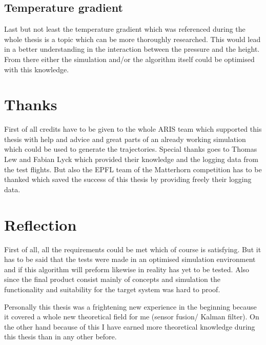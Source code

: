 \subsection{Temperature gradient}
Last but not least the temperature gradient which was referenced during the whole thesis is a topic which can be more thoroughly researched.
This would lead in a better understanding in the interaction between the pressure and the height.
From there either the simulation and/or the algorithm itself could be optimised with this knowledge.

\section{Thanks}
First of all credits have to be given to the whole ARIS team which supported this thesis with help and advice and great parts of an already working simulation which could be used to generate the trajectories.
Special thanks goes to Thomas Lew and Fabian Lyck which provided their knowledge and the logging data from the test flights.
But also the EPFL team of the Matterhorn competition has to be thanked which saved the success of this thesis by providing freely their logging data.

\section{Reflection}
First of all, all the requirements could be met which of course is satisfying. But it has to be said that the tests were made in an optimised simulation environment and if this algorithm will preform likewise in reality has yet to be tested.
Also since the final product consist mainly of concepts and simulation the functionality and suitability for the target system was hard to proof.

Personally this thesis was a frightening new experience in the beginning because it covered a whole new theoretical field for me (sensor fusion/ Kalman filter).
On the other hand because of this I have earned more theoretical knowledge during this thesis than in any other before.
